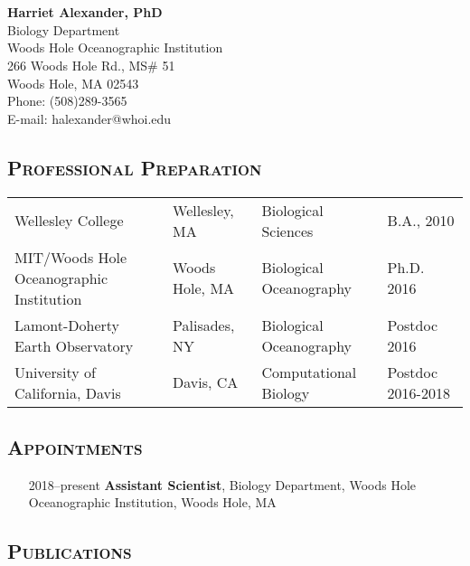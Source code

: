 \documentclass[svgnames,11ptm, a4paper]{article}
\date{}
\author{}
\let\origsection\section%
\let\section\subsubsection%
\let\section\origsection%
\begin{document}

\section*{}
\textbf{\large{Harriet Alexander, PhD}}\\
Biology Department\\
Woods Hole Oceanographic Institution\\
266 Woods Hole Rd., MS\# 51\\
Woods Hole, MA 02543\\
Phone: (508)289-3565\\
E-mail: halexander@whoi.edu\\


\subsection*{\textsc{Professional Preparation}}

\begin{tabular}{ l l l l }
 Wellesley College & Wellesley, MA & Biological Sciences & B.A., 2010 \\
 MIT/Woods Hole Oceanographic Institution  & Woods Hole, MA & Biological Oceanography & Ph.D. 2016 \\
 Lamont-Doherty Earth Observatory & Palisades, NY & Biological Oceanography & Postdoc 2016 \\
 University of California, Davis & Davis, CA & Computational Biology & Postdoc 2016-2018 \\
\end{tabular}

\subsection*{\textsc{Appointments}}

\begin{itemize}[label={--9999:},leftmargin=*,itemsep=0pt]

    \item[2018--present]
        \textbf{Assistant Scientist},
        Biology Department, Woods Hole Oceanographic Institution, Woods Hole, MA

\end{itemize}

\subsection*{\textsc{Publications}}
\end{document}
